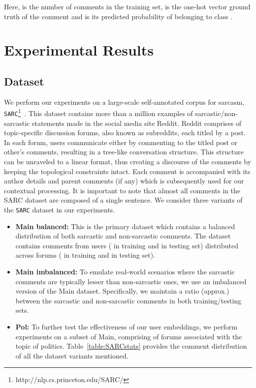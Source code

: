 \documentclass[11pt]{article}
\begin{document}
{Here,  is the number of comments in the training set,  is the one-hot vector ground truth of the  comment and  is its predicted probability of belonging to class .

\section{Experimental Results} \label{sec:experiments}
\subsection{Dataset}\label{sec:dataset}

We perform our experiments on a large-scale self-annotated corpus for sarcasm, \verb|SARC|\footnote{http://nlp.cs.princeton.edu/SARC/}~\cite{khodak2017large}. This dataset contains more than a million examples of sarcastic/non-sarcastic statements made in the social media site Reddit. Reddit comprises of topic-specific discussion forums, also known as subreddits, each titled by a post. In each forum, users communicate either by commenting to the titled post or other's comments, resulting in a tree-like conversation structure. This structure can be unraveled to a linear format, thus creating a discourse of the comments by keeping the topological constraints intact. Each comment is accompanied with its author details and parent comments (if any) which is subsequently used for our contextual processing. It is important to note that almost all comments in the SARC dataset are composed of a single sentence. We consider three variants of the \verb|SARC| dataset in our experiments. 
\begin{itemize}[leftmargin=*]
\itemsep0em 
\item \textbf{Main balanced:} This is the primary dataset which contains a balanced distribution of both sarcastic and non-sarcastic comments. The dataset contains comments from  users ( in training and  in testing set) distributed across  forums ( in training and  in testing set).
\item \textbf{Main imbalanced:} To emulate real-world scenarios where the sarcastic comments are typically lesser than non-sarcastic ones, we use an imbalanced version of the Main dataset. Specifically, we maintain a  ratio (approx.) between the sarcastic and non-sarcastic comments in both training/testing sets.
\item \textbf{Pol:} To further test the effectiveness of our user embeddings, we perform experiments on a subset of Main, comprising of forums associated with the topic of politics. Table~\ref{table:SARCstats} provides the comment distribution of all the dataset variants mentioned. 

\end{itemize}}
\end{document}
